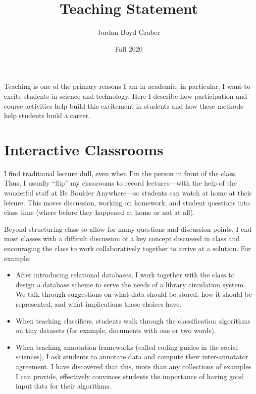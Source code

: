 \documentclass[11pt]{amsart}
\begin{document}
 \title{Teaching Statement}

 \author{Jordan Boyd-Graber}
\address{University of Colorado}

\date{Fall 2020}


\keywords{}

\maketitle

Teaching is one of the primary reasons I am in academia; in particular, I want
to excite students in science and technology. Here I describe how
participation and course activities help build this excitement in students and
how these methods help students build a career.

\section{Interactive Classrooms}

I find traditional lecture dull, even when I'm the person in front of
the class.  Thus, I usually ``flip'' my classrooms to record
lectures---with the help of the wonderful staff at Be Boulder
Anywhere---so students can watch at home at their leisure.  This moves
discussion, working on homework, and student questions into class time
(where before they happened at home or not at all).

Beyond structuring class to allow for many questions and discussion
points, I end most classes with a difficult discussion of a key
concept discussed in class and encouraging the class to work
collaboratively together to arrive at a solution.  For example:
\begin{itemize}
  \item After introducing relational databases, I work together with the class to
design a database scheme to serve the needs of a library circulation
system.  We talk through suggestions on what data should be stored,
how it should be represented, and what implications those choices
have.
  \item When teaching classifiers, students walk through the classification
    algorithms on tiny datasets (for example, documents with one or two words).
  \item When teaching annotation frameworks (called coding guides in the
    social sciences), I ask students to annotate data and
    compute their inter-annotator agreement.  I have discovered that this, more
    than any collections of examples I can provide, effectively convinces
    students the importance of having good input data for their algorithms.
\end{itemize}
\end{document}
